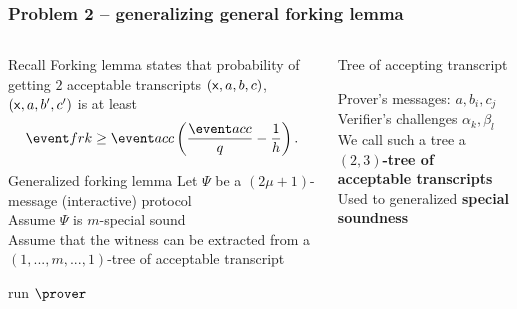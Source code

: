 \documentclass[aspectratio=169,handout]{beamer}
\renewcommand{\emph}[1]{\textbf{#1}}
\renewcommand{\myskip}{0.5\baselineskip}
\begin{document}
\begin{frame}
  \frametitle{Problem 2 -- generalizing general forking lemma}
      \begin{columns}[t]
      \begin{column}{.5\linewidth}
        \begin{block}{Recall}
          Forking lemma states that probability of getting $2$ acceptable
          transcripts $(\mathsf{x}, a, b, c)$, $(\mathsf{x}, a, b', c')$ is at least
    \[
      \frkProb \geq \accProb \left(\frac{\accProb}{q} - \frac{1}{h}\right).
    \]
  \end{block}
  \begin{block}{Generalized forking lemma}
    Let $\Psi$ be a $(2\mu + 1)$-message (interactive) protocol\\
    Assume $\Psi$ is $m$-special sound\\
    Assume that the witness can be extracted from a $(1, ..., m, ..., 1)$-tree
    of acceptable transcript
    \begin{compactitem}
      \item run $\prover$ 
    \end{compactitem}
  \end{block}
\end{column}
\begin{column}{.5\linewidth}
  \begin{block}{Tree of accepting transcript}
    Prover's messages: $a, b_i, c_j$\\
    Verifier's challenges $\alpha_k, \beta_l$\\[\myskip]
    We call such a tree a \emph{$(2, 3)$-tree of acceptable transcripts}\\[\myskip]
    Used to generalized \emph{special soundness}
  \end{block}
\end{column}
\end{columns}
\end{frame}
\end{document}
